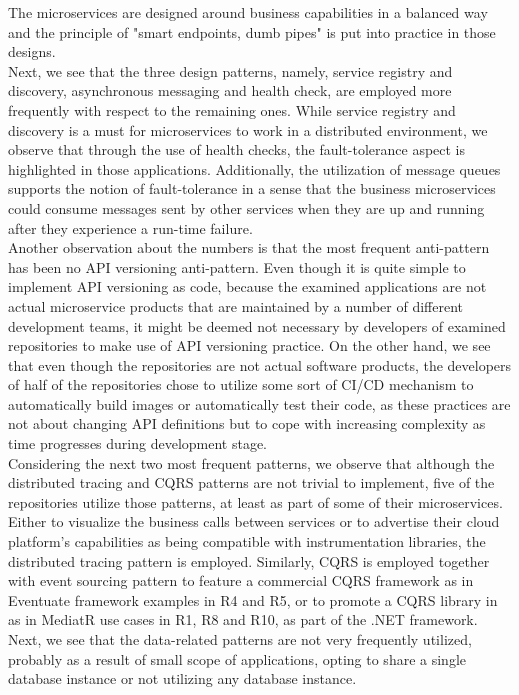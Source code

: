 \documentclass{Configuration_Files/PoliMi3i_thesis}
\begin{document}
The microservices are designed around business capabilities in a balanced way and the principle of "smart endpoints, dumb pipes" is put into practice in those designs.
\\
Next, we see that the three design patterns, namely, service registry and discovery, asynchronous messaging and health check, are employed more frequently with respect to the remaining ones.
While service registry and discovery is a must for microservices to work in a distributed environment, we observe that through the use of health checks, the fault-tolerance aspect is highlighted in those applications.
Additionally, the utilization of message queues supports the notion of fault-tolerance in a sense that the business microservices could consume messages sent by other services when they are up and running after they experience a run-time failure.
\\
Another observation about the numbers is that the most frequent anti-pattern has been no API versioning anti-pattern.
Even though it is quite simple to implement API versioning as code, because the examined applications are not actual microservice products that are maintained by a number of different development teams, it might be deemed not necessary by developers of examined repositories to make use of API versioning practice.
On the other hand, we see that even though the repositories are not actual software products, the developers of half of the repositories chose to utilize some sort of CI/CD mechanism to automatically build images or automatically test their code, as these practices are not about changing API definitions but to cope with increasing complexity as time progresses during development stage.
\\
Considering the next two most frequent patterns, we observe that although the distributed tracing and CQRS patterns are not trivial to implement, five of the repositories utilize those patterns, at least as part of some of their microservices.
Either to visualize the business calls between services or to advertise their cloud platform's capabilities as being compatible with instrumentation libraries, the distributed tracing pattern is employed.
Similarly, CQRS is employed together with event sourcing pattern to feature a commercial CQRS framework as in Eventuate framework examples in R4 and R5, or to promote a CQRS library in as in MediatR use cases in R1, R8 and R10, as part of the .NET framework.
\\
Next, we see that the data-related patterns are not very frequently utilized, probably as a result of small scope of applications, opting to share a single database instance or not utilizing any database instance.
\end{document}
